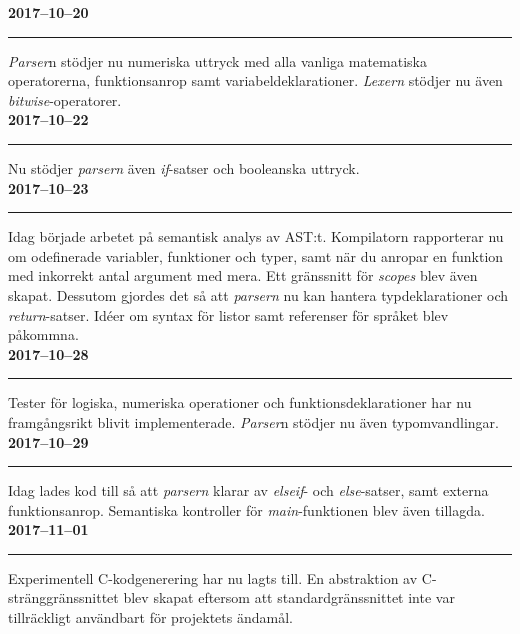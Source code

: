 \documentclass{theme}
\begin{document}
\noindent\textbf{2017--10--20}\\
\noindent\rule{\textwidth}{1pt}

\noindent
\textit{Parser}n stödjer nu numeriska uttryck med alla vanliga matematiska
operatorerna, funktionsanrop samt variabeldeklarationer. \textit{Lexern} stödjer
nu även \textit{bitwise}-operatorer.\\

\noindent\textbf{2017--10--22}\\
\noindent\rule{\textwidth}{1pt}

\noindent
Nu stödjer \textit{parsern} även \textit{if}-satser och booleanska uttryck.\\

\noindent\textbf{2017--10--23}\\
\noindent\rule{\textwidth}{1pt}

\noindent
Idag började arbetet på semantisk analys av AST:t. Kompilatorn rapporterar
nu om odefinerade variabler, funktioner och typer, samt när du anropar en
funktion med inkorrekt antal argument med mera. Ett gränssnitt för
\textit{scopes} blev även skapat. Dessutom gjordes det så att \textit{parsern} 
nu kan hantera typdeklarationer och \textit{return}-satser. Idéer om syntax för 
listor samt referenser för språket blev påkommna. \\

\noindent\textbf{2017--10--28}\\
\noindent\rule{\textwidth}{1pt}

\noindent
Tester för logiska, numeriska operationer och funktionsdeklarationer har nu 
framgångsrikt blivit implementerade. \textit{Parser}n stödjer nu även 
typomvandlingar.\\

\noindent\textbf{2017--10--29}\\
\noindent\rule{\textwidth}{1pt}

\noindent
Idag lades kod till så att \textit{parsern} klarar av \textit{elseif}- och
\textit{else}-satser, samt externa funktionsanrop. Semantiska kontroller för 
\textit{main}-funktionen blev även tillagda.\\

\noindent\textbf{2017--11--01}\\
\noindent\rule{\textwidth}{1pt}

\noindent
Experimentell C-kodgenerering har nu lagts till. En abstraktion av 
C-stränggränssnittet blev skapat eftersom att standardgränssnittet inte var 
tillräckligt användbart för projektets ändamål. \\
\end{document}
